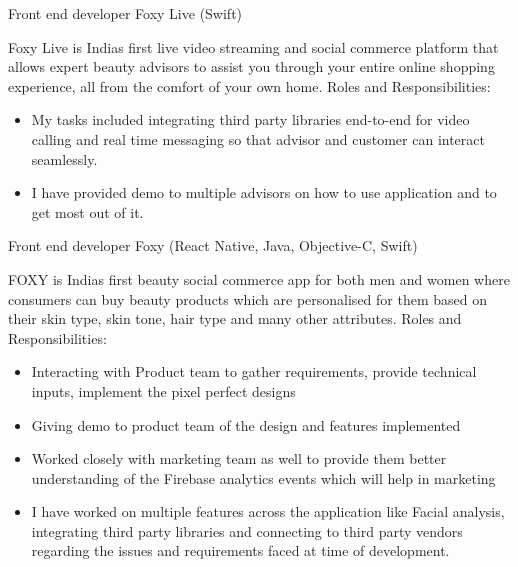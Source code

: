 \begin{cventries}
  \cventry
    {Front end developer}
    {Foxy Live \tiny(Swift)} %
    {} %
    {} %
    {
        Foxy Live is India\textquotesingle s first live video streaming and social commerce platform that allows expert beauty advisors to assist you through your entire online shopping experience, all from the comfort of your own home. \newline Roles and Responsibilities: 
        \begin{itemize}
            \item My tasks included integrating third party libraries end-to-end for video calling and real time messaging so that advisor and customer can interact seamlessly. 
            \item I have provided demo to multiple advisors on how to use application and to get most out of it.
        \end{itemize} 
    }
    


  \cventry
    {Front end developer}
    {Foxy \tiny(React Native, Java, Objective-C, Swift)} %
    {} %
    {} %
    {
        FOXY is India\textquotesingle s first beauty social commerce app for both men and women where consumers can buy beauty products which are personalised for them based on their skin type, skin tone, hair type and many other attributes. \newline Roles and Responsibilities: \begin{itemize}
            \item Interacting with Product team to gather requirements, provide technical inputs, implement the pixel perfect designs
            \item Giving demo to product team of the design and features implemented
            \item Worked closely with marketing team as well to provide them better understanding of the Firebase analytics events which will help in marketing
            \item I have worked on multiple features across the application like Facial analysis, integrating third party libraries and connecting to third party vendors regarding the issues and requirements faced at time of development.
        \end{itemize}
    }



% 


\end{cventries}
